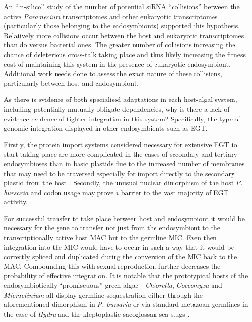 An ``in-silico'' study of the number of potential siRNA ``collisions''
between the active \textit{Paramecium} transcriptomes and other
eukaryotic transcriptomes (particularly those belonging to the endosymbionts) 
supported this hypothesis.  Relatively more collisions occur between
the host and eukaryotic transcriptomes than do versus bacterial ones.
The greater number of collisions increasing the chance of deleterious
cross-talk taking place and thus likely increasing the fitness
cost of maintaining this system in the presence of eukaryotic endosymbiont. 
Additional work needs done to assess the exact nature of these collisions,
particularly between host and endosymbiont. 



As there is evidence of both specialised adaptations in each
host-algal system, including potentially mutually obligate dependencies,
why is there a lack of evidence evidence of tighter 
integration in this system?  Specifically, the type of genomic
integration displayed in other endosymbionts such as EGT.

Firstly, the protein import systems considered necessary for extensive
EGT to start taking place are more complicated
in the cases of secondary and tertiary endosymbioses
than in basic plastids due to the increased number
of membranes that may need to be traversed especially
for import directly to the secondary plastid from the
host \citep{Hirakawa2012}.
Secondly, the unusual nuclear dimorphism of the host \textit{P. bursaria}
and codon usage may prove a barrier to the vast majority of EGT activity. 

For successful transfer to take place between host and endosymbiont it
would be necessary for the gene to transfer not just from the 
endosymbiont to the transcriptionally active host MAC but to the germline
MIC.  Even then integration into the MIC would have to occur in such a way
that it would be correctly spliced and duplicated during the conversion of the MIC
back to the MAC.
Compounding this with sexual reproduction further decreases the probability of
effective integration.
It is notable that the prototypical hosts of the endosymbiotically ``promiscuous''
green algae - \textit{Chlorella}, \textit{Coccomyxa} and \textit{Micractinium} 
all display germline sequestration either through the aforementioned dimorphism
in \textit{P. bursaria} or via standard metazoan germlines in the case of
\textit{Hydra} \citep{Kawaida2013} and the kleptoplastic sacoglossan sea slugs \citep{Yellowlees2008}.



